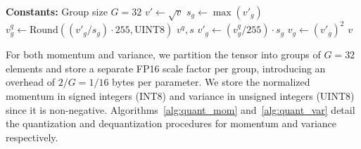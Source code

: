 \documentclass[10pt,twocolumn,letterpaper]{article}
\theoremstyle{plain}
\theoremstyle{definition}
\theoremstyle{remark}
\begin{document}
\begin{algorithm}[t]
\caption{$\mathcal{Q}_v$: Variance Quantization}
\label{alg:quant_var}
\begin{algorithmic}[1]
\Statex \textbf{Constants:} Group size $G = 32$
\vspace{0.25\baselineskip}
    \State $v' \gets \sqrt{v}$
        \State $s_g \gets \max(v'_g)$
        \State $v^q_g \gets \mathrm{Round}((v'_g / s_g) \cdot 255, \text{UINT8})$
    \EndFor
    \State \Return $v^q, s$
\EndFunction
\vspace{0.25\baselineskip}
        \State $v'_g \gets (v^q_g / 255) \cdot s_g$
        \State $v_g \gets (v'_g)^2$
    \EndFor
    \State \Return $v$
\EndFunction
\end{algorithmic}
\end{algorithm}


For both momentum and variance, we partition the tensor into groups of $G=32$ elements and store a separate FP16 scale factor per group, introducing an overhead of $2/G = 1/16$ bytes per parameter.
We store the normalized momentum in signed integers (INT8) and variance in unsigned integers (UINT8) since it is non-negative.
Algorithms~\ref{alg:quant_mom} and~\ref{alg:quant_var} detail the quantization and dequantization procedures for momentum and variance respectively.
\end{document}
